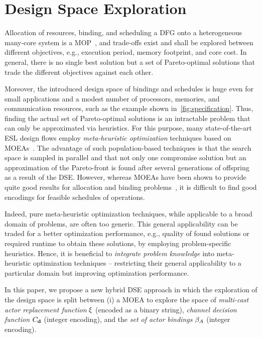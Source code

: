 \section{Design Space Exploration}\label{sec:dse}

Allocation of resources, binding, and scheduling a \ac{DFG} onto a heterogeneous many-core system is a \ac{MOP}~\cite{Blickle1998,teichHSWCOUT}, and trade-offs exist and shall be explored between different objectives, e.g., execution period, memory footprint, and core cost.
In general, there is no single best solution but a set of Pareto-optimal solutions that trade the different objectives against each other.
\par
Moreover, the introduced design space of bindings and schedules is huge even for small applications and a modest number of processors, memories, and communication resources, such as the example shown in~\cref{fig:specification}.
Thus, finding the actual set of Pareto-optimal solutions is an intractable problem that can only be approximated via heuristics.
For this purpose, many state-of-the-art \ac{ESL} design flows employ \emph{meta-heuristic optimization} techniques based on \acp{MOEA}~\cite{Blickle1998,Keinert:2009,Letras:2020}.
The advantage of such population-based techniques is that the search space is sampled in parallel and that not only one compromise solution but an approximation of the Pareto-front is found after several generations of offspring as a result of the \ac{DSE}.
However, whereas \acp{MOEA} have been shown to provide quite good results for allocation and binding problems~\cite{Blickle1998,teichHSWCOUT}, it is difficult to find good encodings for feasible schedules of operations.
\par
Indeed, pure meta-heuristic optimization techniques, while applicable to a broad domain of problems, are often too generic.
This general applicability can be traded for a better optimization performance, e.g., quality of found solutions or required runtime to obtain these solutions, by employing problem-specific heuristics.
Hence, it is beneficial to \emph{integrate problem knowledge} into meta-heuristic optimization techniques -- restricting their general applicability to a particular domain but improving optimization performance.
\par
In this paper, we propose a new hybrid \ac{DSE} approach in which the exploration of the design space is split between (i) a \ac{MOEA} to explore the space of \emph{multi-cast actor replacement function} $\xi$ (encoded as a binary string), \emph{channel decision function} $C_\mathtt{\mathbf{d}}$ (integer encoding), and the \emph{set of actor bindings} $\beta_A$ (integer encoding).
